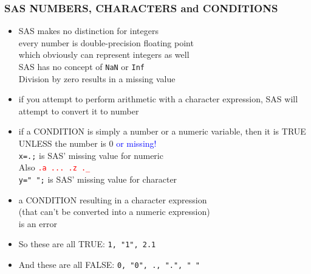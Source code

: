 \documentclass[11pt,pdftex,dvipsnames,usenames,helvetica]{beamer}
\begin{document}
\begin{frame}[fragile]
\frametitle{SAS NUMBERS, CHARACTERS and CONDITIONS}
\begin{itemize}
\item SAS makes no distinction for integers\\ 
every number is double-precision floating point\\
which obviously can represent integers as well\\
SAS has no concept of {\tt NaN} or {\tt Inf}\\
Division by zero results in a missing value
\item if you attempt to perform arithmetic with a character expression,
SAS will attempt to convert it to number
\item if a CONDITION is simply a number or a numeric variable, then it is TRUE
UNLESS the number is 0 \textcolor{blue}{or missing!}\\
{\tt x=.;} is SAS' missing value for numeric\\
Also \textcolor{red}{\tt .a ...\ .z .\_}\\
{\tt y=" ";} is SAS' missing value for character
\item 
a CONDITION resulting in a character expression\\ 
(that can't be converted into a numeric expression)\\ is an error
\item So these are all TRUE:
{\tt 1, "1", 2.1}
\item And these are all FALSE:
{\tt 0, "0", ., ".", " "}

\end{itemize}
\end{frame}
\end{document}
